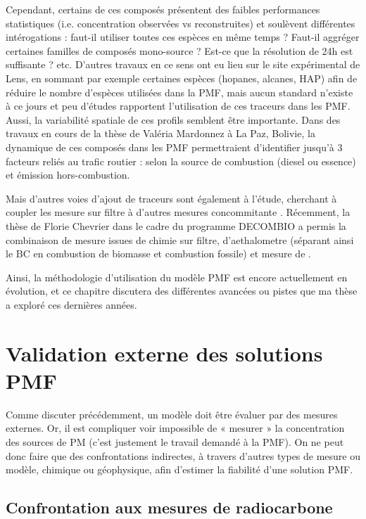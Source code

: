Cependant, certains de ces composés présentent des faibles performances statistiques (i.e.
concentration observées vs reconstruites) et soulèvent différentes intérogations : faut-il
utiliser toutes ces espèces en même temps ? Faut-il aggréger certaines familles de
composés mono-source ? Est-ce que la résolution de 24h est suffisante ?  etc. D'autres
travaux en ce sens ont eu lieu sur le site expérimental de Lens, en sommant par exemple
certaines espèces (hopanes, alcanes, HAP) afin de réduire le nombre d'espèces utilisées
dans la PMF, mais aucun standard n'existe à ce jours et peu d'études rapportent
l'utilisation de ces traceurs dans les PMF.
Aussi, la variabilité spatiale de ces profils semblent être importante. Dans des travaux en
cours de la thèse de Valéria Mardonnez à La Paz, Bolivie, la dynamique de ces composés
dans les PMF permettraient d'identifier jusqu'à 3 facteurs reliés au trafic routier : selon
la source de combustion (diesel ou essence) et émission hors-combustion.

Mais d'autres voies d'ajout de traceurs sont également à l'étude, cherchant à coupler les
mesure sur filtre à d'autres mesures concommitante \parencite{srivastavaSpeciation2019}.
Récemment, la thèse de Florie Chevrier \autocite{chevrierChauffage2016} dans le cadre du
programme DECOMBIO a permis la combinaison de mesure issues de chimie sur filtre,
d'aethalometre (séparant ainsi le BC en combustion de biomasse et combustion fossile) et
mesure de .

Ainsi, la méthodologie d'utilisation du modèle PMF est encore actuellement en évolution,
et ce chapitre discutera des différentes avancées ou pistes que ma thèse a exploré ces
dernières années.

\section{Validation externe des solutions PMF}%
\label{sec:confrontation_des_solutions_pmf}

Comme discuter précédemment, un modèle doit être évaluer par des mesures externes. Or, il
est compliquer voir impossible de « mesurer » la concentration des sources de PM (c'est
justement le travail demandé à la PMF). On ne peut donc faire que des confrontations
indirectes, à travers d'autres types de mesure ou modèle, chimique ou géophysique, afin
d'estimer la fiabilité d'une solution PMF.

\subsection{Confrontation aux mesures de radiocarbone }%
\label{sub:14c}

